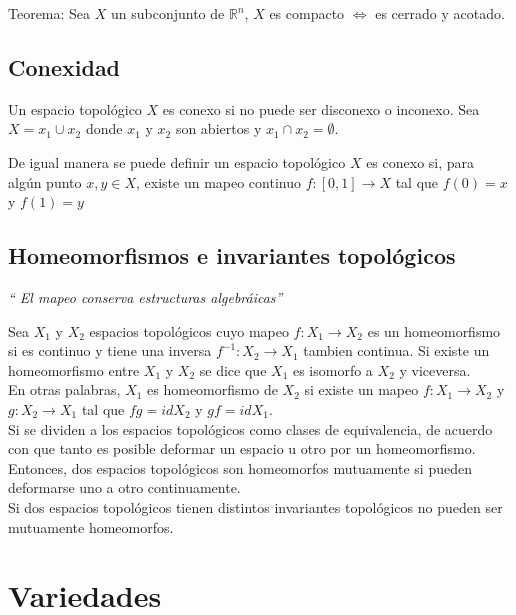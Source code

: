 \documentclass{report}
\begin{document}
Teorema: Sea $X$ un subconjunto de $\mathbb{R}^{n}$, $X$ es compacto $\Leftrightarrow$ es cerrado y acotado.

\subsection{Conexidad}

Un espacio topológico $X$ es conexo si no puede ser disconexo o inconexo. Sea $X = x_{1} \cup x_{2}$ donde $x_{1}$ y $x_{2}$ son abiertos y $x_{1} \cap x_{2} = \emptyset$.

De igual manera se puede definir un espacio topológico $X$ es conexo si, para algún punto $x,y \in X$, existe un mapeo continuo $f : [0,1] \rightarrow X$ tal que $f(0) = x$ y $f(1) = y$\\

\subsection{Homeomorfismos e invariantes topológicos}

\textit{`` El mapeo conserva estructuras algebráicas''}

Sea $X_{1}$ y $X_{2}$ espacios topológicos cuyo mapeo $f: X_{1} \rightarrow X_{2}$ es un homeomorfismo si es continuo y tiene una inversa $f^{-1}: X_{2} \rightarrow X_{1}$ tambien continua. Si existe un homeomorfismo entre $X_{1}$ y $X_{2}$ se dice que $X_{1}$ es isomorfo a $X_{2}$ y viceversa.\\

En otras palabras, $X_{1}$ es homeomorfismo de $X_{2}$ si existe un mapeo $f : X_{1} \rightarrow X_{2}$ y $g : X_{2} \rightarrow X_{1}$ tal que $fg = idX_{2}$ y $gf=idX_{1}$.\\

Si se dividen a los espacios topológicos como clases de equivalencia, de acuerdo con que tanto es posible deformar un espacio u otro por un homeomorfismo. Entonces, dos espacios topológicos son homeomorfos mutuamente si pueden deformarse uno a otro continuamente.\\

Si dos espacios topológicos tienen distintos invariantes topológicos no pueden ser mutuamente homeomorfos.\\

\section{Variedades}
\end{document}
